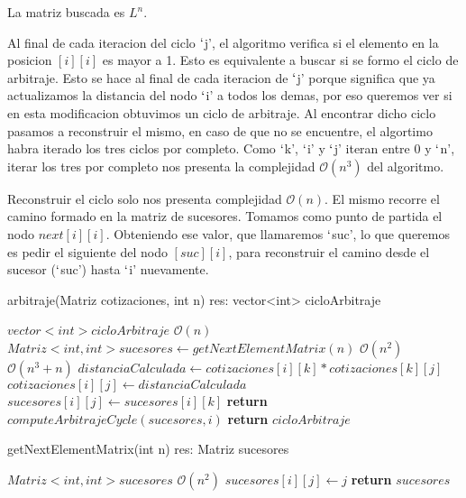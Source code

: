 La matriz buscada es $L^{n}$.

Al final de cada iteracion del ciclo $`$j', el algoritmo verifica si el elemento en la posicion $[i][i]$ es mayor a 1. Esto es equivalente a buscar si se formo el ciclo de arbitraje. Esto se hace al final de cada iteracion de $`$j' porque significa que ya actualizamos la distancia del nodo $`$i' a todos los demas, por eso queremos ver si en esta modificacion obtuvimos un ciclo de arbitraje. Al encontrar dicho ciclo pasamos a reconstruir el mismo, en caso de que no se encuentre, el algortimo habra iterado los tres ciclos por completo. Como $`$k', $`$i' y $`$j' iteran entre 0 y $`$n', iterar los tres por completo nos presenta la complejidad $\mathcal{O}(n^{3})$ del algoritmo.

Reconstruir el ciclo solo nos presenta complejidad $\mathcal{O}(n)$. El mismo recorre el camino formado en la matriz de sucesores. Tomamos como punto de partida el nodo $next[i][i]$. Obteniendo ese valor, que llamaremos $`$suc', lo que queremos es pedir el siguiente del nodo $[suc][i]$, para reconstruir el camino desde el sucesor ($`$suc') hasta $`$i' nuevamente.

\begin{algorithm}[H]
	\caption{arbitraje(Matriz cotizaciones, int n) res: vector<int> cicloArbitraje}
	\begin{algorithmic}[1]
		\State $vector<int> cicloArbitraje$ \Comment $\mathcal{O}(n)$
		\State $Matriz<int, int> sucesores \gets getNextElementMatrix(n)$ \Comment $\mathcal{O}(n^{2})$
		 \Comment $\mathcal{O}(n^{3} + n)$
					\State $distanciaCalculada \gets cotizaciones[i][k] * cotizaciones[k][j]$
						\State $cotizaciones[i][j] \gets distanciaCalculada$
						\State $sucesores[i][j] \gets sucesores[i][k]$
					\EndIf
				\EndFor
					\State \textbf{return} $computeArbitrajeCycle(sucesores, i)$
				\EndIf
			\EndFor
		\EndFor
		\State \textbf{return} $cicloArbitraje$
	\end{algorithmic}
\end{algorithm}


\begin{algorithm}[H]
	\caption{getNextElementMatrix(int n) res: Matriz sucesores}
	\begin{algorithmic}[1]
		\State $Matriz<int, int> sucesores$
		 \Comment $\mathcal{O}(n^{2})$
				\State $sucesores[i][j] \gets j$
			\EndFor
		\EndFor
		\State \textbf{return} $sucesores$
	\end{algorithmic}
\end{algorithm}


